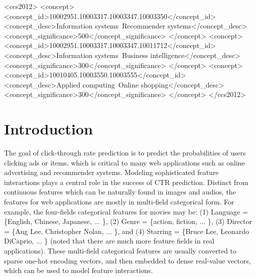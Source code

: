 \documentclass[sigconf]{acmart}
\begin{document}
\begin{CCSXML}
<ccs2012>
<concept>
<concept_id>10002951.10003317.10003347.10003350</concept_id>
<concept_desc>Information systems~Recommender systems</concept_desc>
<concept_significance>500</concept_significance>
</concept>
<concept>
<concept_id>10002951.10003317.10003347.10011712</concept_id>
<concept_desc>Information systems~Business intelligence</concept_desc>
<concept_significance>300</concept_significance>
</concept>
<concept>
<concept_id>10010405.10003550.10003555</concept_id>
<concept_desc>Applied computing~Online shopping</concept_desc>
<concept_significance>300</concept_significance>
</concept>
</ccs2012>
\end{CCSXML}





\maketitle

\section{Introduction}
The goal of click-through rate prediction is to predict the probabilities of users clicking ads or items, which is critical to many web applications such as online advertising and recommender systems.
Modeling sophisticated feature interactions plays a central role in the success of CTR prediction.
Distinct from continuous features which can be naturally found in images and audios, the features for web applications are mostly in multi-field categorical form.
For example, the four-fields categorical features for movies may be: (1) \textsf{Language = \{English, Chinese, Japanese, ... \}}, (2) \textsf{Genre = \{action, fiction, ... \}}, (3) \textsf{Director = \{Ang Lee, Christopher Nolan, ... \}}, and (4) \textsf{Starring = \{Bruce Lee, Leonardo DiCaprio, ... \}} (noted that there are much more feature fields in real applications).
These multi-field categorical features are usually converted to sparse one-hot encoding vectors, and then embedded to dense real-value vectors, which can be used to model feature interactions.           
\end{document}
